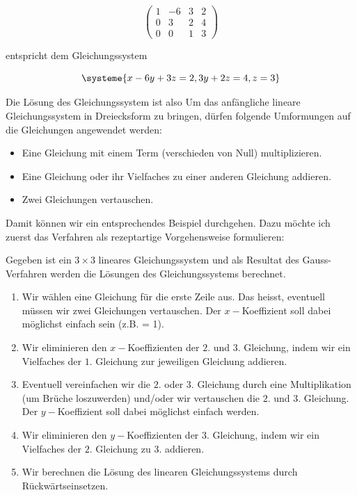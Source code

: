 \documentclass[11pt,oneside]{article}
\begin{document}
	\begin{minipage}{0.25\linewidth}
		\begingroup
		\renewcommand{\arraystretch}{1.2}
		\[\begin{pmatrix}
			1 & -6 & 3 & 2\\
			0 & 3 & 2 & 4\\
			0 & 0 & 1 & 3
		\end{pmatrix}\]
		\endgroup
	\end{minipage}
	\hfill
	\begin{minipage}{0.4\linewidth}
		entspricht dem Gleichungssystem
	\end{minipage}
	\hfill
	\begin{minipage}{0.25\linewidth}
		\[\systeme{x-6y+3z=2,3y+2z=4,z=3}\]
	\end{minipage}\vspace*{14pt}\newline
	Die Lösung des Gleichungssystem ist also \vspace*{7pt}\newline{}
	Um das anfängliche lineare Gleichungssystem in Dreiecksform zu bringen, dürfen folgende Umformungen auf die Gleichungen angewendet werden:
	\begin{itemize}
		\item Eine Gleichung mit einem Term (verschieden von Null) multiplizieren.
		\item Eine Gleichung oder ihr Vielfaches zu einer anderen Gleichung addieren.
		\item Zwei Gleichungen vertauschen.
	\end{itemize}
	Damit können wir ein entsprechendes Beispiel durchgehen. Dazu möchte ich zuerst das Verfahren als rezeptartige Vorgehensweise formulieren:
	\begin{algo}
		Gegeben ist ein $3\times3$ lineares Gleichungssystem und als Resultat des Gauss-Verfahren werden die Lösungen des Gleichungssystems berechnet.
		\begin{enumerate}
			\item Wir wählen eine Gleichung für die erste Zeile aus. Das heisst, eventuell müssen wir zwei Gleichungen vertauschen. Der $x-$Koeffizient soll dabei möglichst einfach sein (z.B. = 1).
			\item Wir eliminieren den $x-$Koeffizienten der $2.$ und $3.$ Gleichung, indem wir ein Vielfaches der $1.$ Gleichung zur jeweiligen Gleichung addieren.
			\item Eventuell vereinfachen wir die $2.$ oder $3.$ Gleichung durch eine Multiplikation	(um Brüche loszuwerden) und/oder wir vertauschen die $2.$ und $3.$	Gleichung. Der $y-$Koeffizient soll dabei möglichst einfach werden.
			\item Wir eliminieren den $y-$Koeffizienten der $3.$ Gleichung, indem wir ein Vielfaches der $2.$ Gleichung zu $3.$ addieren.
			\item Wir berechnen die Lösung des linearen Gleichungssystems durch Rückwärtseinsetzen.
		\end{enumerate}
	\end{algo}
\end{document}
